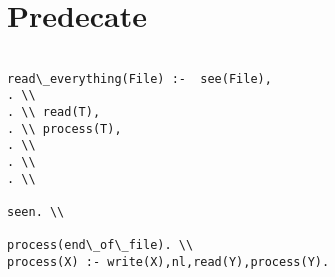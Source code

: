 \documentclass[a4paper,12pt]{article}
\begin{document}
\section{Predecate}


\begin{lstlisting}

read\_everything(File) :-  see(File),
. \\ 
. \\ read(T),
. \\ process(T),
. \\
. \\
. \\

seen. \\

process(end\_of\_file). \\
process(X) :- write(X),nl,read(Y),process(Y).

\end{lstlisting}
\end{document}

